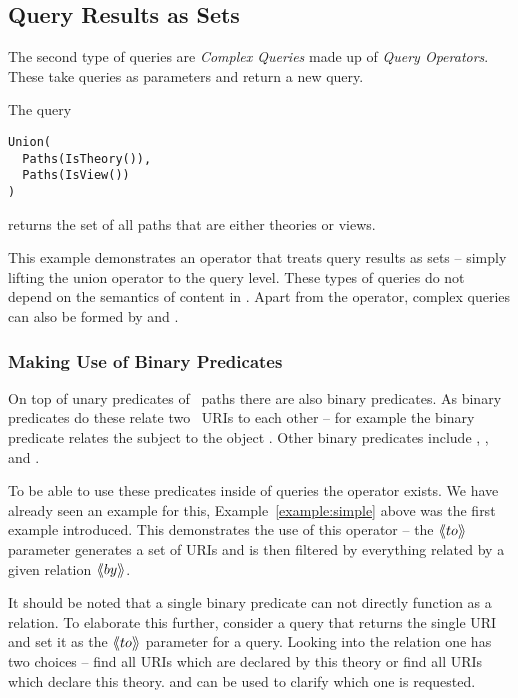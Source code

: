\subsection{Query Results as Sets}\label{sec:qmt:results}

The second type of queries are \textit{Complex Queries} made up of \textit{Query Operators}. 
These take queries as parameters and return a new query.

\begin{example}\label{example:unions}
The query \begin{lstlisting}[language=qmt]
Union(
  Paths(IsTheory()), 
  Paths(IsView())
)
  \end{lstlisting} returns the set of all paths that are either theories or views.
\end{example}
This example demonstrates an operator that treats query results as sets -- simply lifting the union operator to the query level.
These types of queries do not depend on the semantics of content in \mmt.
Apart from the  operator, complex queries can also be formed by  and .

\subsubsection*{Making Use of Binary Predicates}\label{sec:qmt:binary}

On top of unary predicates of \mmt\ paths there are also binary predicates.
As binary predicates do these relate two \mmt\ URIs to each other -- for example the binary predicate  relates the subject  to the object .
Other binary predicates include , ,  and .

To be able to use these predicates inside of queries the  operator exists.
We have already seen an example for this, Example~\ref{example:simple} above was the first example introduced.
This demonstrates the use of this operator -- the $\langle\kern-.25em\langle to\rangle\kern-.2em\rangle$ parameter generates a set of URIs and is then filtered by everything related by a given relation $\langle\kern-.25em\langle by\rangle\kern-.2em\rangle$.

It should be noted that a single binary predicate can not directly function as a relation.
To elaborate this further, consider a query that returns the single URI  and set it as the $\langle\kern-.25em\langle to\rangle\kern-.2em\rangle$ parameter for a  query.
Looking into the  relation one has two choices -- find all URIs which are declared by this theory or find all URIs which declare this theory.
 and  can be used to clarify which one is requested. 

